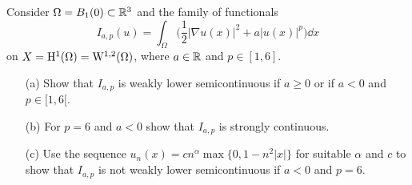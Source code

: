\documentclass[12pt,a4paper]{article}
\begin{document}
 Consider $\Omega =
B_1(0)\subset {\mathbb R}^3$ and the family of functionals
\[
I_{a,p}(u)= \int_\Omega \Big(\frac12|\nabla u(x)|^2 + a |u(x)|^p \Big) \dd x 
\]
on $X= {\mathrm H}^1(\Omega)={\mathrm W}^{1,2}(\Omega)$, where $a \in {\mathbb R}$ and $p\in {[1,6]}$. 
\begin{itemize}
\item[(a)] Show that $I_{a,p}$ is weakly lower semicontinuous if $a\geq 0$ or if  $a<0$ and $p\in {[1,6[}$. 

\item[(b)] For $p=6$ and $a<0$ show that $I_{a,p}$ is strongly continuous. 

\item[(c)] Use the sequence $u_n(x)= c n^\alpha \max\{ 0, 1{-}n^2|x|\}$ for
suitable $\alpha$ and $c$ to 
show that $I_{a,p}$ is not weakly lower semicontinuous if $a<0$ and $p=6$. 
\end{itemize}
\end{document}
